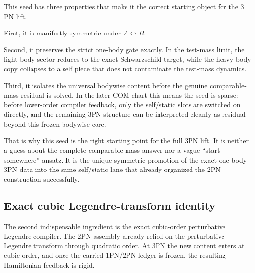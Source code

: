 \documentclass[11pt]{article}
\begin{document}
This seed has three properties that make it the correct starting object for the
$3$PN lift.

First, it is manifestly symmetric under $A\leftrightarrow B$.

Second, it preserves the strict one-body gate exactly.  In the test-mass limit,
the light-body sector reduces to the exact Schwarzschild target, while the
heavy-body copy collapses to a self piece that does not contaminate the test-mass
dynamics.

Third, it isolates the universal bodywise content before the genuine
comparable-mass residual is solved.  In the later COM chart this means the seed
is sparse: before lower-order compiler feedback, only the self/static slots are
switched on directly, and the remaining $3$PN structure can be interpreted
cleanly as residual beyond this frozen bodywise core.

That is why this seed is the right starting point for the full $3$PN lift.  It
is neither a guess about the complete comparable-mass answer nor a vague
``start somewhere'' ansatz.  It is the unique symmetric promotion of the exact
one-body $3$PN data into the same self/static lane that already organized the
$2$PN construction successfully.

\subsection{Exact cubic Legendre-transform identity}
\label{sec:onebody-legendre}

The second indispensable ingredient is the exact cubic-order perturbative
Legendre compiler.  The $2$PN assembly already relied on the perturbative
Legendre transform through quadratic order.  At $3$PN the new content enters at
cubic order, and once the carried $1$PN/$2$PN ledger is frozen, the resulting
Hamiltonian feedback is rigid.
\end{document}

